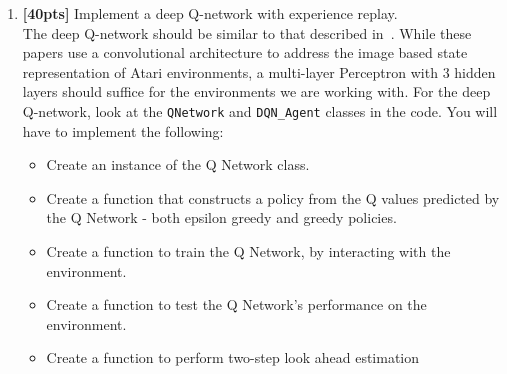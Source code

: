 \documentclass[12pt]{article}
\begin{document}
\begin{enumerate}[label=\textbf{4.\arabic*}]
	\item \label{DQN} \textbf{[40pts]} Implement a deep Q-network with experience replay. \\
	The deep Q-network should be similar to that described in~\cite{mnih2013playing, mnih2015human}. While these papers use a convolutional architecture to address the image based state representation of Atari environments, a multi-layer Perceptron with $3$ hidden layers should suffice for the environments we are working with. 
 For the deep Q-network, look at the \texttt{QNetwork} and \texttt{DQN\_Agent} classes in the code. You will have to implement the following: 
    \begin{itemize}
        \item Create an instance of the Q Network class.
        \item Create a function that constructs a policy from the Q values predicted by the Q Network - both epsilon greedy and greedy policies.
        \item Create a function to train the Q Network, by interacting with the environment.
        \item  Create a function to test the Q Network's performance on the environment.
        \item Create a function to perform two-step look ahead estimation
    \end{itemize}
   

\end{enumerate}
\end{document}
